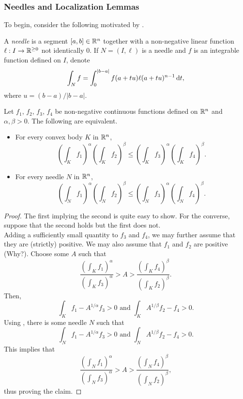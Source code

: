 \subsubsection{Needles and Localization Lemmas}
\label{sec: 5.1.2}

To begin, consider the following motivated by .

\begin{definition}
	A \textit{needle} is a segment $[a,b]\in\mathbb{R}^n$ together with a non-negative linear function $\ell:I\to\mathbb{R}^{\geq 0}$ not identically $0$. If $N=(I,\ell)$ is a needle and $f$ is an integrable function defined on $I$, denote
	\[ \int_N f = \int_{0}^{|b-a|} f(a+tu)\ell(a+tu)^{n-1} \operatorname{d}\!{t}, \]
	where $u=(b-a)/|b-a|$.
\end{definition}

\begin{lemma}
	\label{lem: 5.1}
	Let $f_1$, $f_2$, $f_3$, $f_4$ be non-negative continuous functions defined on $\mathbb{R}^n$ and $\alpha,\beta>0$. The following are equivalent.
	\begin{itemize}
		\item For every convex body $K$ in $\mathbb{R}^n$,
			\[ \left(\int_K f_1\right)^\alpha \left(\int_K f_2\right)^\beta \leq \left(\int_K f_3\right)^\alpha \left(\int_K f_4\right)^\beta. \]
		\item For every needle $N$ in $\mathbb{R}^n$,
			\[ \left(\int_N f_1\right)^\alpha \left(\int_N f_2\right)^\beta \leq \left(\int_N f_3\right)^\alpha \left(\int_N f_4\right)^\beta. \]
	\end{itemize}
\end{lemma}
\begin{proof}
	The first implying the second is quite easy to show. For the converse, suppose that the second holds but the first does not.\\
	Adding a sufficiently small quantity to $f_3$ and $f_4$, we may further assume that they are (strictly) positive. We may also assume that $f_1$ and $f_2$ are positive (Why?). Choose some $A$ such that
	\[ \frac{\left(\int_K f_1\right)^\alpha}{\left(\int_K f_3\right)^\alpha} > A > \frac{\left(\int_K f_4\right)^\beta}{\left(\int_K f_2\right)^\beta}. \]
	Then,
	\[ \int_K f_1 - A^{1/\alpha}f_3 > 0 \text{ and } \int_K A^{1/\beta}f_2 - f_4 > 0. \]
	Using , there is some needle $N$ such that
	\[ \int_N f_1 - A^{1/\alpha}f_3 > 0 \text{ and } \int_N A^{1/\beta}f_2 - f_4 > 0. \]
	This implies that
	\[ \frac{\left(\int_N f_1\right)^\alpha}{\left(\int_N f_3\right)^\alpha} > A > \frac{\left(\int_N f_4\right)^\beta}{\left(\int_N f_2\right)^\beta}, \]
	thus proving the claim.
\end{proof}

